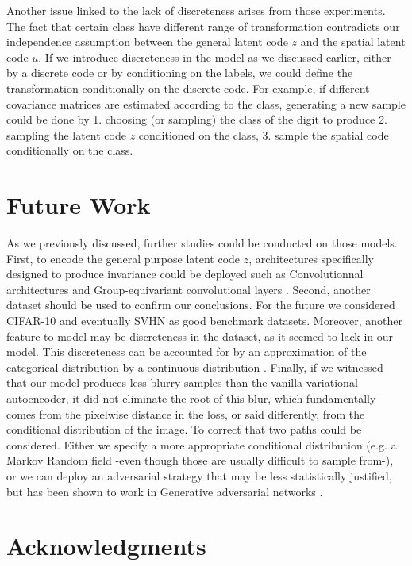 \documentclass[letterpaper, twoside]{article}
\begin{document}
      Another issue linked to the lack of discreteness arises from those experiments. The fact that certain class have different range of transformation contradicts our independence assumption between the general latent code $z$ and the spatial latent code $u$. If we introduce discreteness in the model as we discussed earlier, either by a discrete code or by conditioning on the labels, we could define the transformation conditionally on the discrete code. For example, if different covariance matrices are estimated according to the class, generating a new sample could be done by 1. choosing (or sampling) the class of the digit to produce 2. sampling the latent code $z$ conditioned on the class, 3. sample the spatial code conditionally on the class.


\section{Future Work}

  As we previously discussed, further studies could be conducted on those models. First, to encode the general purpose latent code $z$, architectures specifically designed to produce invariance could be deployed such as Convolutionnal architectures \cite{lecun-gradientbased-learning-applied-1998} and Group-equivariant convolutional layers \cite{cohen.groupequi}. Second, another dataset should be used to confirm our conclusions. For the future we considered CIFAR-10 \cite{cifar10} and eventually SVHN \cite{svhn} as good benchmark datasets. Moreover, another feature to model may be discreteness in the dataset, as it seemed to lack in our model. This discreteness can be accounted for by an approximation of the categorical distribution by a continuous distribution \cite{JangCatReparam}. Finally, if we witnessed that our model produces less blurry samples than the vanilla variational autoencoder, it did not eliminate the root of this blur, which fundamentally comes from the pixelwise distance in the loss, or said differently, from the conditional distribution of the image. To correct that two paths could be considered. Either we specify a more appropriate conditional distribution (e.g. a Markov Random field \cite{Geman:1984:SRG:2286442.2286617} -even though those are usually difficult to sample from-), or we can deploy an adversarial strategy that may be less statistically justified, but has been shown to work in Generative adversarial networks \cite{Goodfellow.gan}.


\section*{Acknowledgments} 
\end{document}
